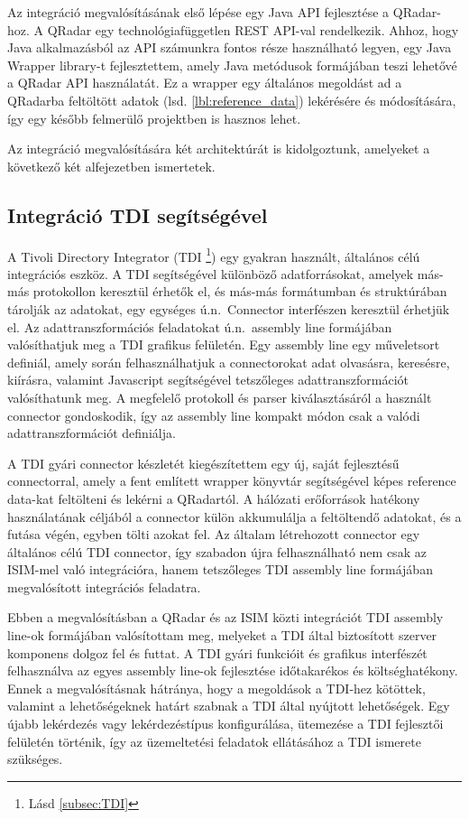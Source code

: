 Az integráció megvalósításának első lépése egy Java API fejlesztése a QRadar-hoz. A QRadar egy technológiafüggetlen REST API-val rendelkezik. Ahhoz, hogy Java alkalmazásból az API számunkra fontos része használható legyen, egy Java Wrapper library-t fejlesztettem, amely Java metódusok formájában teszi lehetővé a QRadar API használatát. Ez a wrapper egy általános megoldást ad a QRadarba feltöltött adatok (lsd. \ref{lbl:reference_data}) lekérésére és módosítására, így egy később felmerülő projektben is hasznos lehet.

Az integráció megvalósítására két architektúrát is kidolgoztunk, amelyeket a következő két alfejezetben ismertetek.

\subsection{Integráció TDI segítségével}

A Tivoli Directory Integrator (TDI \footnote{\label{foot:TDI}Lásd \ref{subsec:TDI} }) egy gyakran használt, általános célú integrációs eszköz. 
A TDI segítségével különböző adatforrásokat, amelyek más-más protokollon keresztül érhetők el, és más-más formátumban és struktúrában tárolják az adatokat, egy egységes ú.n.~Connector interfészen keresztül érhetjük el. Az adattranszformációs feladatokat ú.n.~assembly line formájában valósíthatjuk meg a TDI grafikus felületén. Egy assembly line egy műveletsort definiál, amely során felhasználhatjuk a connectorokat adat olvasásra, keresésre, kiírásra, valamint Javascript segítségével tetszőleges adattranszformációt valósíthatunk meg. A megfelelő protokoll és parser kiválasztásáról a használt connector gondoskodik, így az assembly line kompakt módon csak a valódi adattranszformációt definiálja. 

A TDI gyári connector készletét kiegészítettem egy új, saját fejlesztésű connectorral, amely a fent említett wrapper könyvtár segítségével képes reference data-kat feltölteni és lekérni a QRadartól. A hálózati erőforrások hatékony használatának céljából a connector külön akkumulálja a feltöltendő adatokat, és a futása végén, egyben tölti azokat fel. Az általam létrehozott connector egy általános célú TDI connector, így szabadon újra felhasználható nem csak az ISIM-mel való integrációra, hanem tetszőleges TDI assembly line formájában megvalósított integrációs feladatra. 

Ebben a megvalósításban a QRadar és az ISIM közti integrációt TDI assembly line-ok formájában valósítottam meg, melyeket a TDI által biztosított szerver komponens dolgoz fel és futtat. A TDI gyári funkcióit és grafikus interfészét felhasználva az egyes assembly line-ok fejlesztése időtakarékos és költséghatékony. Ennek a megvalósításnak hátránya, hogy a megoldások a TDI-hez kötöttek, valamint a lehetőségeknek határt szabnak a TDI által nyújtott lehetőségek. Egy újabb lekérdezés vagy lekérdezéstípus konfigurálása, ütemezése a TDI fejlesztői felületén történik, így az üzemeltetési feladatok ellátásához a TDI ismerete szükséges.


